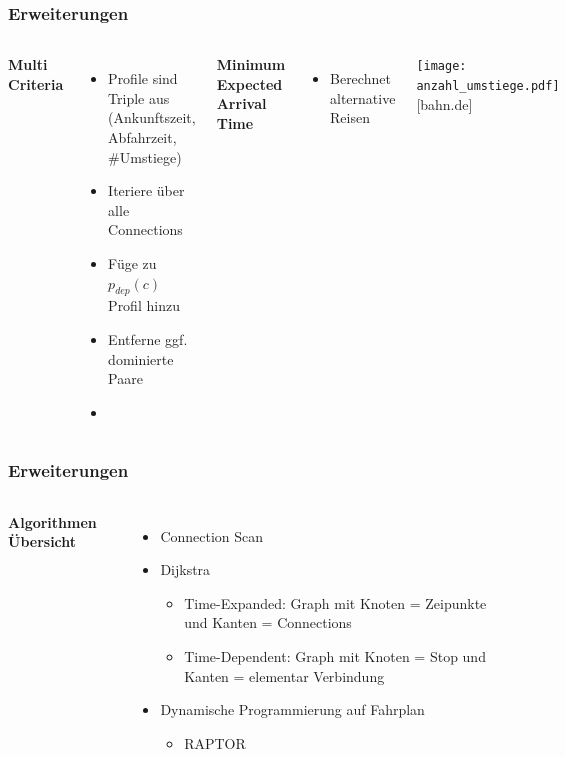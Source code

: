 \documentclass[aspectratio=169]{beamer}
\begin{document}
\begin{frame}
\frametitle{Erweiterungen}
\begin{columns}[c] %
	
	\textbf{Multi Criteria}
	\begin{itemize}
		\item Profile sind Triple aus \\ (Ankunftszeit, Abfahrzeit, \#Umstiege)
		\item Iteriere über alle Connections
		\item Füge zu $p_{dep}(c)$ Profil hinzu
		\item Entferne ggf. dominierte Paare
		\item []
	\end{itemize}
	\textbf{Minimum Expected Arrival Time}
	\begin{itemize}
		\item Berechnet alternative Reisen
	\end{itemize}
	\texttt{[image: anzahl\_umstiege.pdf]}
	\centering
	\tiny [bahn.de]
	  
\end{columns}
\end{frame}
	

	
\begin{frame}
\frametitle{Erweiterungen}
\begin{columns}[c] %
	
	\textbf{Algorithmen Übersicht}
	\begin{itemize}
		\item Connection Scan
		\item Dijkstra
		\begin{itemize}
			\item Time-Expanded: Graph mit Knoten = Zeipunkte und Kanten = Connections
			\item Time-Dependent: Graph mit Knoten = Stop und Kanten = elementar Verbindung
		\end{itemize}
		\item Dynamische Programmierung auf Fahrplan
		\begin{itemize}
			\item RAPTOR
		\end{itemize}
	\end{itemize}

		
\end{columns}
\end{frame}
	
\end{document}
